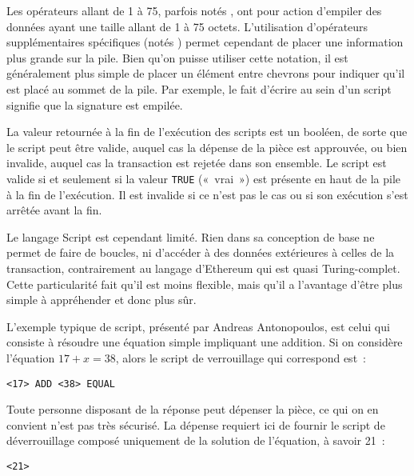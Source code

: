 Les opérateurs allant de 1 à 75, parfois notés , ont pour action d'empiler des données ayant une taille allant de 1 à 75 octets. L'utilisation d'opérateurs supplémentaires spécifiques (notés ) permet cependant de placer une information plus grande sur la pile. Bien qu'on puisse utiliser cette notation, il est généralement plus simple de placer un élément entre chevrons pour indiquer qu'il est placé au sommet de la pile. Par exemple, le fait d'écrire  au sein d'un script signifie que la signature est empilée.

La valeur retournée à la fin de l'exécution des scripts est un booléen, de sorte que le script peut être valide, auquel cas la dépense de la pièce est approuvée, ou bien invalide, auquel cas la transaction est rejetée dans son ensemble. Le script est valide si et seulement si la valeur \texttt{TRUE} («~vrai~») est présente en haut de la pile à la fin de l'exécution. Il est invalide si ce n'est pas le cas ou si son exécution s'est arrêtée avant la fin.

Le langage Script est cependant limité. Rien dans sa conception de base ne permet de faire de boucles, ni d'accéder à des données extérieures à celles de la transaction, contrairement au langage d'Ethereum qui est quasi Turing-complet. Cette particularité fait qu'il est moins flexible, mais qu'il a l'avantage d'être plus simple à appréhender et donc plus sûr.

L'exemple typique de script, présenté par Andreas Antonopoulos, est celui qui consiste à résoudre une équation simple impliquant une addition. Si on considère l'équation $17 + x = 38$, alors le script de verrouillage qui correspond est~:

\begin{Verbatim}[fontsize=\footnotesize]
<17> ADD <38> EQUAL
\end{Verbatim}

Toute personne disposant de la réponse peut dépenser la pièce, ce qui on en convient n'est pas très sécurisé. La dépense requiert ici de fournir le script de déverrouillage composé uniquement de la solution de l'équation, à savoir 21~:

\begin{Verbatim}[fontsize=\footnotesize]
<21>
\end{Verbatim}


